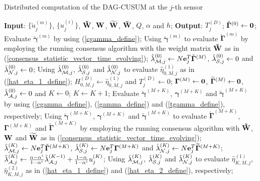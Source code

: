 \documentclass[11pt, draftclsnofoot, onecolumn]{IEEEtran}
\newcommand{\bgamma}{{\boldsymbol{\gamma}}}
\newcommand{\cbgamma}{{\check{\boldsymbol{\gamma}}}}
\newcommand{\tbgamma}{{\widetilde{\boldsymbol{\gamma}}}}
\newcommand{\bGamma}{{\boldsymbol{\Gamma}}}
\newcommand{\cbGamma}{{\check{\boldsymbol{\Gamma}}}}
\newcommand{\tbGamma}{{\widetilde{\boldsymbol{\Gamma}}}}
\newcommand{\cu}{{\check{u}}}
\newcommand{\cW}{{\check{W}}}
\newcommand{\tW}{{\widetilde{W}}}
\begin{document}
\begin{algorithm}[htb]
	\caption{Distributed computation of the DAG-CUSUM at the $j$-th sensor}
	\begin{algorithmic}[1]
		\STATE \textbf{Input}:  $\{\cu_j^{(m)}\}$, $\{u_j^{(i)}\}$, ${\bf{\cW}}$,  ${\bf{W}}$, $\bf{\tW}$, $\bf{\bar W}$, $Q$, $\alpha$ and $h$;
		\STATE  \textbf{Output}: $T_j^{(D)}$;
		\STATE $\cbGamma^{(0)} \leftarrow {\bf 0}$;
		\STATE Evaluate $\cbgamma^{(m)}$ by using (\ref{cgamma_define});
		\STATE Using $\cbgamma^{(m)}$ to evaluate $\cbGamma^{(m)}$ by employing the running consensus algorithm with the weight matrix ${\bf{\cW}}$ as in (\ref{consensus_statistic_vector_time_evolving});
		\ENDFOR
		\STATE $\hat \lambda _{{\cal M},j}^{(0)} \leftarrow N{\bf{e}}_j^T{\cbGamma ^{\left( M \right)}}$, $\hat \lambda _{{\cal S},j}^{(0)} \leftarrow 0 $ and  $\hat \lambda _{{\cal N},j}^{(0)} \leftarrow 0 $;
		\STATE Using $\hat \lambda _{{\cal M},j}^{(0)}$, $\hat \lambda _{{\cal S},j}^{(0)}$ and $\hat \lambda _{{\cal N},j}^{(0)}$ to evaluate ${\hat \eta _{0,M,j}^{(1)}}$ as in (\ref{hat_eta_1_define});
		\STATE $H_{0,M,j}^{\left( D \right)} \leftarrow \hat \eta _{0,M,j}^{(1)}$ and $T_j^{(D)} \leftarrow 0$;
		\STATE $\bGamma^{(M)} \leftarrow {\bf 0}$, $\tbGamma^{(M)} \leftarrow {\bf 0}$, $\hat \lambda _{{\cal A},j}^{(0)} \leftarrow 0$ and $K  \leftarrow 0$;
		\STATE $K \leftarrow K +1$;
		\STATE Evaluate $\cbgamma^{(M+K)}$, $\bgamma^{(M+K)}$ and $\tbgamma^{(M+K)}$ by using (\ref{cgamma_define}), (\ref{gamma_define}) and (\ref{tgamma_define}), respectively;
		\STATE Using $\cbgamma^{(M+K)}$, $\bgamma^{(M+K)}$ and $\tbgamma^{(M+K)}$ to evaluate $\cbGamma^{(M+K)}$, $\bGamma^{(M+K)}$ and $\tbGamma^{(M+K)}$ by employing the running consensus algorithm with ${\bf{\cW}}$,  ${\bf{W}}$ and $\bf{\tW}$ as in (\ref{consensus_statistic_vector_time_evolving});
		\STATE  $\hat \lambda _{{\cal M},j}^{(K)} \leftarrow N{\bf{e}}_j^T{\cbGamma ^{\left( M+K \right)}}$, $\hat \lambda _{{\cal S},j}^{(K)} \leftarrow N{\bf{e}}_j^T{\bGamma ^{\left( M+K \right)}}$ and $\hat \lambda _{{\cal N},j}^{(K)} \leftarrow N{\bf{e}}_j^T{\tbGamma ^{\left( M+K \right)}}$;
		\STATE $\hat \lambda _{{\cal A},j}^{(K)}  \leftarrow \frac{{\alpha  - {\alpha ^i}}}{{1 - {\alpha ^i}}}\hat \lambda _{{\cal A},j}^{(K - 1)} + \frac{{1 - \alpha }}{{1 - {\alpha ^i}}}u_j^{(K)}$;
		\STATE Using $\hat \lambda _{{\cal M},j}^{(K)}$, $\hat \lambda _{{\cal S},j}^{(K)}$ and $\hat \lambda _{{\cal N},j}^{(K)}$ to evaluate ${\hat \eta _{K,M,j}^{(1)}}$,  ${\hat \eta _{K,M,j}^{(2)}}$ as in (\ref{hat_eta_1_define}) and (\ref{hat_eta_2_define}), respectively;

\end{algorithmic}
\end{algorithm}
\end{document}
